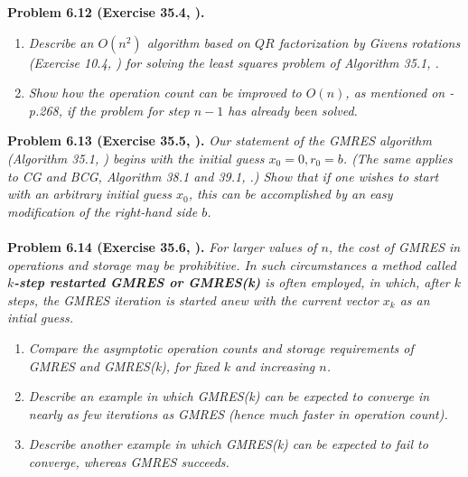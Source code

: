\documentclass[a4paper,oneside]{book}
\numberwithin{equation}{chapter}
\begin{document}
\textbf{Problem 6.12 (Exercise 35.4, \cite{1}).}
\begin{enumerate}
\item \textit{Describe an $O\left(n^2\right)$ algorithm based on $QR$ factorization by Givens rotations (Exercise 10.4, \cite{1}) for solving the least squares problem of Algorithm 35.1, \cite{1}.}
\item \textit{Show how the operation count can be improved to $O\left(n\right)$, as mentioned on \cite{1} - p.268, if the problem for step $n-1$ has already been solved.}
\end{enumerate}
\textbf{Problem 6.13 (Exercise 35.5, \cite{1}).} \textit{Our statement of the GMRES algorithm (Algorithm 35.1, \cite{1}) begins with the initial guess $x_0 =0,r_0=b$. (The same applies to CG and BCG, Algorithm 38.1 and 39.1, \cite{1}.) Show that if one wishes to start with an arbitrary initial guess $x_0$, this can be accomplished by an easy modification of the right-hand side $b$.}\\
\\
\textbf{Problem 6.14 (Exercise 35.6, \cite{1}).} \textit{For larger values of $n$, the cost of GMRES in operations and storage may be prohibitive. In such circumstances a method called \textbf{$k$-step restarted GMRES or GMRES(k)} is often employed, in which, after $k$ steps, the GMRES iteration is started anew with the current vector $x_k$ as an intial guess.}
\begin{enumerate}
\item \textit{Compare the asymptotic operation counts and storage requirements of GMRES and GMRES(k), for fixed $k$ and increasing $n$.}
\item \textit{Describe an example in which GMRES(k) can be expected to converge in nearly as few iterations as GMRES (hence much faster in operation count).}
\item \textit{Describe another example in which GMRES(k) can be expected to fail to converge, whereas GMRES succeeds.}
\end{enumerate}
\end{document}
